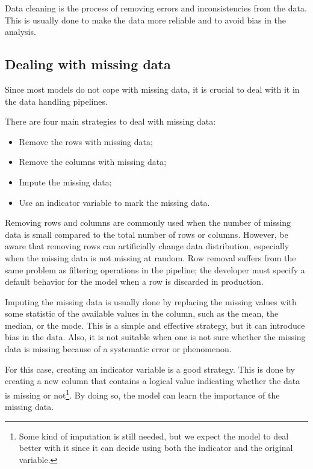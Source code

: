 Data cleaning is the process of removing errors and inconsistencies from the data.  This is
usually done to make the data more reliable and to avoid bias in the analysis.

\subsection{Dealing with missing data}

Since most models do not cope with missing data, it is crucial to deal with it in the data
handling pipelines.

There are four main strategies to deal with missing data:
\begin{itemize}
  \item Remove the rows with missing data;
  \item Remove the columns with missing data;
  \item Impute the missing data;
  \item Use an indicator variable to mark the missing data.
\end{itemize}

Removing rows and columns are commonly used when the number of missing data is small
compared to the total number of rows or columns.  However, be aware that removing rows can
artificially change data distribution, especially when the missing data is not missing at
random.  Row removal suffers from the same problem as filtering operations in the
pipeline; the developer must specify a default behavior for the model when a row is
discarded in production.

Imputing the missing data is usually done by replacing the missing values with some
statistic of the available values in the column, such as the mean, the median, or the
mode.  This is a simple and effective strategy, but it can introduce bias in the data.
Also, it is not suitable when one is not sure whether the missing data is missing because
of a systematic error or phenomenon.

For this case, creating an indicator variable is a good strategy.  This is done by creating
a new column that contains a logical value indicating whether the data is missing or
not\footnote{Some kind of imputation is still needed, but we expect the model to deal
better with it since it can decide using both the indicator and the original variable.}.
By doing so, the model can learn the importance of the missing data.


